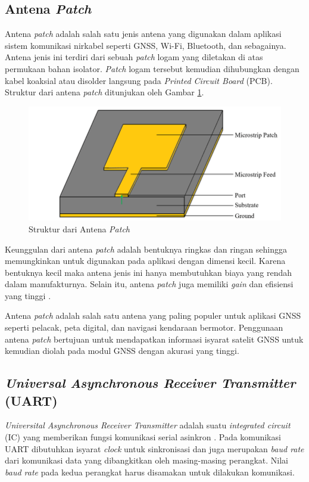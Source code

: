 \subsection{Antena \textit{Patch}}
Antena \textit{patch} adalah salah satu jenis antena yang digunakan dalam aplikasi sistem komunikasi nirkabel seperti GNSS, Wi-Fi, Bluetooth, dan sebagainya. Antena jenis ini terdiri dari sebuah \textit{patch} logam yang diletakan di atas permukaan bahan isolator. \textit{Patch} logam tersebut kemudian dihubungkan dengan kabel koaksial atau disolder langsung pada \textit{Printed Circuit Board} (PCB). Struktur dari antena \textit{patch} ditunjukan oleh Gambar \ref{Fig: patc-antenna}.

\begin{figure}[ht]
	\centering
	\includegraphics[width=12cm]{contents/chapter-2/patch-antena.jpg}
	\caption{Struktur dari Antena \textit{Patch} \cite{Chowdhury2019}}
	\label{Fig: patc-antenna}
\end{figure}

Keunggulan dari antena \textit{patch} adalah bentuknya ringkas dan ringan sehingga memungkinkan untuk digunakan pada aplikasi dengan dimensi kecil. Karena bentuknya kecil maka antena jenis ini hanya membutuhkan biaya yang rendah dalam manufakturnya. Selain itu, antena \textit{patch} juga memiliki \textit{gain} dan efisiensi yang tinggi \cite{Ding2020}.

Antena \textit{patch} adalah salah satu antena yang paling populer untuk aplikasi GNSS seperti pelacak, peta digital, dan navigasi kendaraan bermotor. Penggunaan antena \textit{patch} bertujuan untuk mendapatkan informasi isyarat satelit GNSS untuk kemudian diolah pada modul GNSS dengan akurasi yang tinggi.

\subsection{\textit{Universal Asynchronous Receiver Transmitter} (UART)}
\textit{Universital Asynchronous Receiver Transmitter} adalah suatu \textit{integrated circuit} (IC) yang memberikan fungsi komunikasi serial asinkron \cite{ti2010}. Pada komunikasi UART dibutuhkan isyarat \textit{clock} untuk sinkronisasi dan juga merupakan \textit{baud rate} dari komunikasi data yang dibangkitkan oleh masing-masing perangkat. Nilai \textit{baud rate} pada kedua perangkat harus disamakan untuk dilakukan komunikasi.

